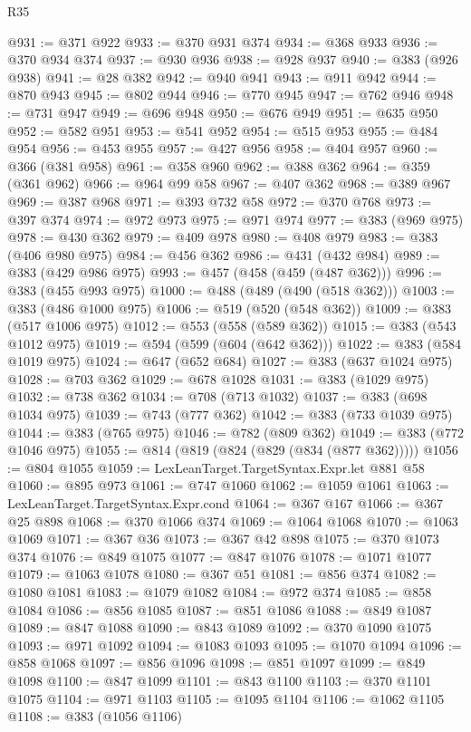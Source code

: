 \begin{lexlean}{R35}
\begin{coremodule}
@931 := @371 @922
@933 := @370 @931 @374
@934 := @368 @933
@936 := @370 @934 @374
@937 := @930 @936
@938 := @928 @937
@940 := @383 (@926 @938)
@941 := @28 @382
@942 := @940 @941
@943 := @911 @942
@944 := @870 @943
@945 := @802 @944
@946 := @770 @945
@947 := @762 @946
@948 := @731 @947
@949 := @696 @948
@950 := @676 @949
@951 := @635 @950
@952 := @582 @951
@953 := @541 @952
@954 := @515 @953
@955 := @484 @954
@956 := @453 @955
@957 := @427 @956
@958 := @404 @957
@960 := @366 (@381 @958)
@961 := @358 @960
@962 := @388 @362
@964 := @359 (@361 @962)
@966 := @964 @99 @58
@967 := @407 @362
@968 := @389 @967
@969 := @387 @968
@971 := @393 @732 @58
@972 := @370 @768
@973 := @397 @374
@974 := @972 @973
@975 := @971 @974
@977 := @383 (@969 @975)
@978 := @430 @362
@979 := @409 @978
@980 := @408 @979
@983 := @383 (@406 @980 @975)
@984 := @456 @362
@986 := @431 (@432 @984)
@989 := @383 (@429 @986 @975)
@993 := @457 (@458 (@459 (@487 @362)))
@996 := @383 (@455 @993 @975)
@1000 := @488 (@489 (@490 (@518 @362)))
@1003 := @383 (@486 @1000 @975)
@1006 := @519 (@520 (@548 @362))
@1009 := @383 (@517 @1006 @975)
@1012 := @553 (@558 (@589 @362))
@1015 := @383 (@543 @1012 @975)
@1019 := @594 (@599 (@604 (@642 @362)))
@1022 := @383 (@584 @1019 @975)
@1024 := @647 (@652 @684)
@1027 := @383 (@637 @1024 @975)
@1028 := @703 @362
@1029 := @678 @1028
@1031 := @383 (@1029 @975)
@1032 := @738 @362
@1034 := @708 (@713 @1032)
@1037 := @383 (@698 @1034 @975)
@1039 := @743 (@777 @362)
@1042 := @383 (@733 @1039 @975)
@1044 := @383 (@765 @975)
@1046 := @782 (@809 @362)
@1049 := @383 (@772 @1046 @975)
@1055 := @814 (@819 (@824 (@829 (@834 (@877 @362)))))
@1056 := @804 @1055
@1059 := LexLeanTarget.TargetSyntax.Expr.let @881 @58
@1060 := @895 @973
@1061 := @747 @1060
@1062 := @1059 @1061
@1063 := LexLeanTarget.TargetSyntax.Expr.cond
@1064 := @367 @167
@1066 := @367 @25 @898
@1068 := @370 @1066 @374
@1069 := @1064 @1068
@1070 := @1063 @1069
@1071 := @367 @36
@1073 := @367 @42 @898
@1075 := @370 @1073 @374
@1076 := @849 @1075
@1077 := @847 @1076
@1078 := @1071 @1077
@1079 := @1063 @1078
@1080 := @367 @51
@1081 := @856 @374
@1082 := @1080 @1081
@1083 := @1079 @1082
@1084 := @972 @374
@1085 := @858 @1084
@1086 := @856 @1085
@1087 := @851 @1086
@1088 := @849 @1087
@1089 := @847 @1088
@1090 := @843 @1089
@1092 := @370 @1090 @1075
@1093 := @971 @1092
@1094 := @1083 @1093
@1095 := @1070 @1094
@1096 := @858 @1068
@1097 := @856 @1096
@1098 := @851 @1097
@1099 := @849 @1098
@1100 := @847 @1099
@1101 := @843 @1100
@1103 := @370 @1101 @1075
@1104 := @971 @1103
@1105 := @1095 @1104
@1106 := @1062 @1105
@1108 := @383 (@1056 @1106)

\end{coremodule}
\end{lexlean}
